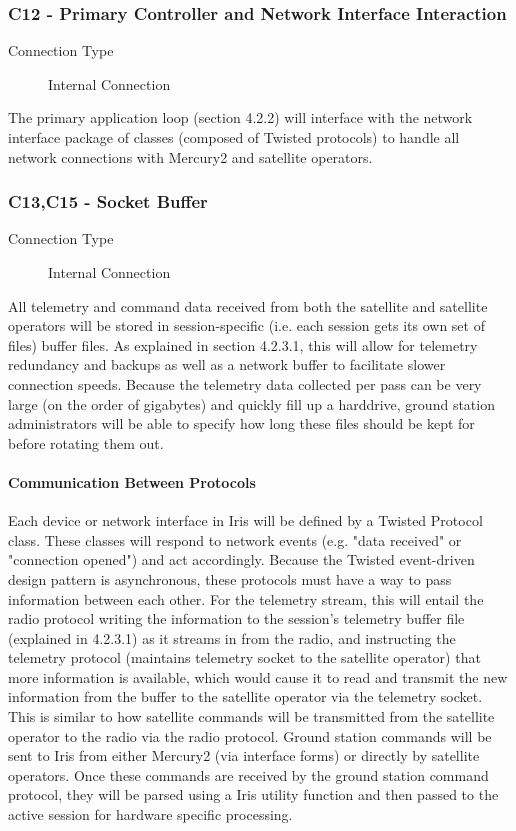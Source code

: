 \documentclass{mxl-note}
\begin{document}
\subsubsection{C12 - Primary Controller and Network Interface Interaction}
\begin{description}
	\item [Connection Type] Internal Connection
\end{description}
The primary application loop (section 4.2.2) will interface with the network interface package of classes (composed of Twisted protocols) to handle all network connections with Mercury2 and satellite operators.

\subsubsection{C13,C15 - Socket Buffer}
\begin{description}
	\item [Connection Type] Internal Connection
\end{description}
All telemetry and command data received from both the satellite and satellite operators will be stored in session-specific (i.e. each session gets its own set of files) buffer files. As explained in section 4.2.3.1, this will allow for telemetry redundancy and backups as well as a network buffer to facilitate slower connection speeds. Because the telemetry data collected per pass can be very large (on the order of gigabytes) and quickly fill up a harddrive, ground station administrators will be able to specify how long these files should be kept for before rotating them out.

\paragraph{Communication Between Protocols}
Each device or network interface in Iris will be defined by a Twisted Protocol class. These classes will respond to network events (e.g. "data received" or "connection opened") and act accordingly. Because the Twisted event-driven design pattern is asynchronous, these protocols must have a way to pass information between each other. For the telemetry stream, this will entail the radio protocol writing the information to the session's telemetry buffer file (explained in 4.2.3.1) as it streams in from the radio, and instructing the telemetry protocol (maintains telemetry socket to the satellite operator) that more information is available, which would cause it to read and transmit the new information from the buffer to the satellite operator via the telemetry socket. This is similar to how satellite commands will be transmitted from the satellite operator to the radio via the radio protocol. Ground station commands will be sent to Iris from either Mercury2 (via interface forms) or directly by satellite operators. Once these commands are received by the ground station command protocol, they will be parsed using a Iris utility function and then passed to the active session for hardware specific processing.
\end{document}
